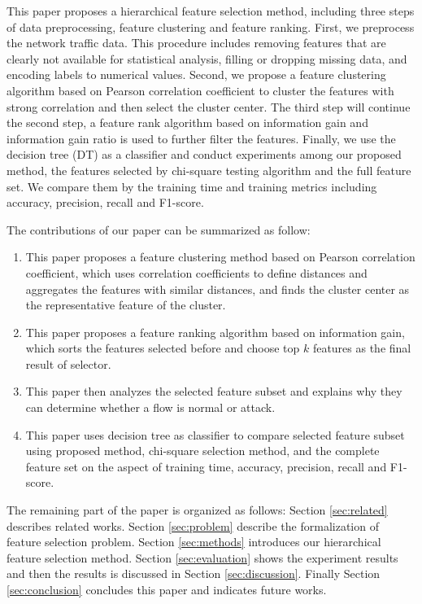 \documentclass[journal]{IEEEtran}
\begin{document}
This paper proposes a hierarchical feature selection method, including three steps of data preprocessing, feature clustering and feature ranking. First, we preprocess the network traffic data. This procedure includes removing features that are clearly not available for statistical analysis, filling or dropping missing data, and encoding labels to numerical values. Second, we propose a feature clustering algorithm based on Pearson correlation coefficient to cluster the features with strong correlation and then select the cluster center. The third step will continue the second step, a feature rank algorithm based on information gain and information gain ratio is used to further filter the features. Finally, we use the decision tree (DT) as a classifier and conduct experiments among our proposed method, the features selected by chi-square testing algorithm and the full feature set. We compare them by the training time and training metrics including accuracy, precision, recall and F1-score. 

The contributions of our paper can be summarized as follow:

\begin{enumerate}
    \item This paper proposes a feature clustering method based on Pearson correlation coefficient, which uses correlation coefficients to define distances and aggregates the features with similar distances, and finds the cluster center as the representative feature of the cluster.
    \item This paper proposes a feature ranking algorithm based on information gain, which sorts the features selected before and choose top $k$ features as the final result of selector.
    \item This paper then analyzes the selected feature subset and explains why they can determine whether a flow is normal or attack.
    \item This paper uses decision tree as classifier to compare selected feature subset using proposed method, chi-square selection method, and the complete feature set on the aspect of training time, accuracy, precision, recall and F1-score.
\end{enumerate}

The remaining part of the paper is organized as follows: Section \ref{sec:related} describes related works. Section \ref{sec:problem} describe the formalization of feature selection problem. Section \ref{sec:methods} introduces our hierarchical feature selection method. Section \ref{sec:evaluation} shows the experiment results and then the results is discussed in Section \ref{sec:discussion}. Finally Section \ref{sec:conclusion} concludes this paper and indicates future works.
\end{document}
